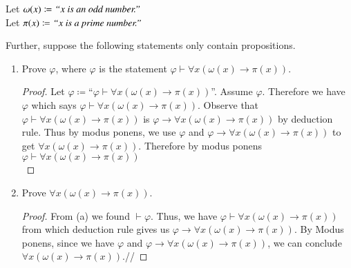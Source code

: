 \documentclass{article}
\newcommand{\lif}{\mathrel{\rightarrow}}
\newcommand{\proves}{\mathrel{\vdash}}
\newcommand{\defeq}{\mathrel{\coloneqq}}
\begin{document}
\begin{enumerate}
    Let $\omega(x) \defeq \emph{``}x\emph{ is an odd number.''}$ \\
    Let $\pi(x) \defeq \emph{``}x\emph{ is a prime number.''}$

    Further, suppose the following statements only contain propositions.
    \begin{enumerate}
      \item
        Prove $\varphi$, where $\varphi$ is the statement $\varphi \proves \forall x \left(\omega(x) \lif \pi(x)\right)$.
        \begin{proof}
        Let $\varphi\coloneqq$``$\varphi \proves \forall x \left(\omega(x) \lif \pi(x)\right)$''. Assume  $\varphi$. Therefore we have $\varphi$ which says $\varphi \proves \forall x \left(\omega(x) \lif \pi(x)\right)$. Observe that $\varphi \proves \forall x \left(\omega(x) \lif \pi(x)\right)$ is $\varphi \lif \forall x \left(\omega(x) \lif \pi(x)\right)$ by deduction rule. Thus by modus ponens, we use $\varphi$ and $\varphi \lif \forall x \left(\omega(x) \lif \pi(x)\right)$ to get $\forall x \left(\omega(x) \lif \pi(x)\right)$. Therefore by modus ponens $\varphi \proves \forall x \left(\omega(x) \lif \pi(x)\right)$
 \\
        \end{proof}
      \item
        Prove $\forall x \left(\omega(x) \lif \pi(x)\right)$.
        \begin{proof}
        From (a) we found $\proves\varphi$. Thus, we have $\varphi \proves \forall x \left(\omega(x) \lif \pi(x)\right)$ from which deduction rule gives us $\varphi \lif \forall x \left(\omega(x) \lif \pi(x)\right)$. By Modus ponens, since we have $\varphi$ and $\varphi \lif \forall x \left(\omega(x) \lif \pi(x)\right)$, we can conclude $\forall x \left(\omega(x) \lif \pi(x)\right)$.//
        \end{proof}
  \end{enumerate}
\end{enumerate}
\end{document}
